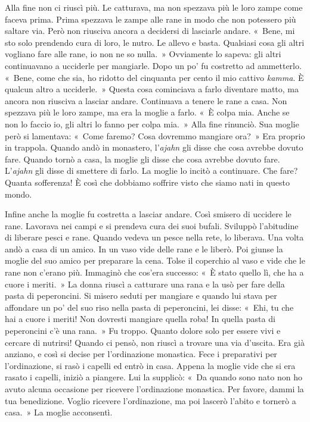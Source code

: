 Alla fine non ci riuscì più. Le catturava, ma non spezzava più le loro
zampe come faceva prima. Prima spezzava le zampe alle rane in modo che
non potessero più saltare via. Però non riusciva ancora a decidersi di
lasciarle andare. «~Bene, mi sto solo prendendo cura di loro, le nutro.
Le allevo e basta. Qualsiasi cosa gli altri vogliano fare alle rane, io
non ne so nulla.~» Ovviamente lo sapeva: gli altri continuavano a
ucciderle per mangiarle. Dopo un po' fu costretto ad ammetterlo. «~Bene,
come che sia, ho ridotto del cinquanta per cento il mio cattivo
\emph{kamma}. È qualcun altro a ucciderle.~» Questa cosa cominciava a
farlo diventare matto, ma ancora non riusciva a lasciar andare.
Continuava a tenere le rane a casa. Non spezzava più le loro zampe, ma
era la moglie a farlo. «~È colpa mia. Anche se non lo faccio io, gli
altri lo fanno per colpa mia.~» Alla fine rinunciò. Sua moglie però si
lamentava: «~Come faremo? Cosa dovremmo mangiare ora?~» Era proprio in
trappola. Quando andò in monastero, l'\emph{ajahn} gli disse che cosa
avrebbe dovuto fare. Quando tornò a casa, la moglie gli disse che cosa
avrebbe dovuto fare. L'\emph{ajahn} gli disse di smettere di farlo. La
moglie lo incitò a continuare. Che fare? Quanta sofferenza! È così che
dobbiamo soffrire visto che siamo nati in questo mondo.

Infine anche la moglie fu costretta a lasciar andare. Così smisero di
uccidere le rane. Lavorava nei campi e si prendeva cura dei suoi bufali.
Sviluppò l'abitudine di liberare pesci e rane. Quando vedeva un pesce
nella rete, lo liberava. Una volta andò a casa di un amico. In un vaso
vide delle rane e le liberò. Poi giunse la moglie del suo amico per
preparare la cena. Tolse il coperchio al vaso e vide che le rane non
c'erano più. Immaginò che cos'era successo: «~È stato quello lì, che ha
a cuore i meriti.~» La donna riuscì a catturare una rana e la usò per
fare della pasta di peperoncini. Si misero seduti per mangiare e quando
lui stava per affondare un po' del suo riso nella pasta di peperoncini,
lei disse: «~Ehi, tu che hai a cuore i meriti! Non dovresti mangiare
quella roba! In quella pasta di peperoncini c'è una rana.~» Fu troppo.
Quanto dolore solo per essere vivi e cercare di nutrirsi! Quando ci
pensò, non riuscì a trovare una via d'uscita. Era già anziano, e così si
decise per l'ordinazione monastica. Fece i preparativi per
l'ordinazione, si rasò i capelli ed entrò in casa. Appena la moglie
vide che si era rasato i capelli, iniziò a piangere. Lui la supplicò:
«~Da quando sono nato non ho avuto alcuna occasione per ricevere
l'ordinazione monastica. Per favore, dammi la tua benedizione. Voglio
ricevere l'ordinazione, ma poi lascerò l'abito e tornerò a casa.~» La
moglie acconsentì.

